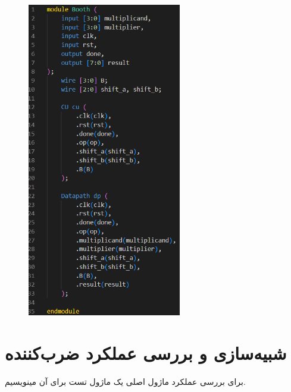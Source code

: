 \documentclass{article}
\begin{document}
\begin{figure}[H]
    \centering
    \includegraphics[width=0.6\textwidth]{Booth.png}
\end{figure}

\section{شبیه‌سازی و بررسی عملکرد ضرب‌کننده}
برای بررسی عملکرد ماژول اصلی یک ماژول تست برای آن مینویسیم.
\end{document}
